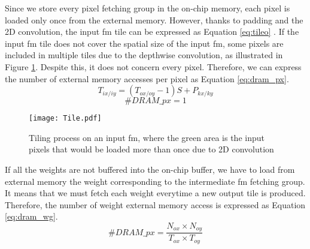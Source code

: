 Since we store every pixel fetching group in the on-chip memory, each pixel is loaded only once from the external memory. However, thanks to padding and the 2D convolution, the input \acrshort{fm} tile can be expressed as Equation \eqref{eq:tileo} \cite{ma_optimizing_2018}. If the input \acrshort{fm} tile does not cover the spatial size of the input \acrshort{fm}, some pixels are included in multiple tiles due to the depthwise convolution, as illustrated in Figure \ref{fig:tilei}. Despite this, it does not concern every pixel. Therefore, we can express the number of external memory accesses per pixel as Equation \eqref{eq:dram_px}.
%
\begin{equation}
    T_{ix/iy} = \left( T_{ox/oy} - 1\right) S + P_{kx/ky}
    \label{eq:tileo}
\end{equation}
\begin{equation}
    \#DRAM\_px = 1
    \label{eq:dram_px}
\end{equation}
%
\begin{figure}[H]
    \centering
    \texttt{[image: Tile.pdf]}
    \caption{Tiling process on an input \acrshort{fm}, where the green area is the input pixels that would be loaded more than once due to 2D convolution}
    \label{fig:tilei}
\end{figure}
%
If all the weights are not buffered into the on-chip buffer, we have to load from external memory the weight corresponding to the intermediate \acrshort{fm} fetching group. It means that we must fetch each weight everytime a new output tile is produced. Therefore, the number of weight external memory access is expressed as Equation \eqref{eq:dram_wg}.
%
\begin{equation}
    \#DRAM\_px = \frac{N_{ox} \times N_{oy}}{T_{ox} \times T_{oy}}
    \label{eq:dram_wg}
\end{equation}
%
